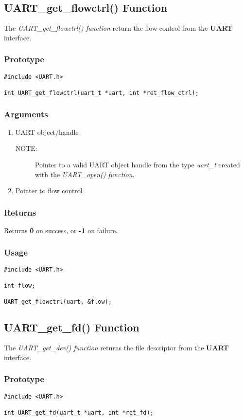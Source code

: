 \documentclass{report}
\begin{document}
\subsection{UART\_get\_flowctrl() Function}
The \textit{UART\_get\_flowctrl() function} return the flow
control from the \textbf{UART} interface.
\subsubsection*{Prototype}
\begin{lstlisting}
#include <UART.h>

int UART_get_flowctrl(uart_t *uart, int *ret_flow_ctrl);
\end{lstlisting}
\subsubsection*{Arguments}
\begin{enumerate}
\item UART object/handle
\begin{description}
\item[NOTE:] Pointer to a valid UART object handle from the type \textit{uart\_t}
created with the \textit{UART\_open() function}.
\end{description}
\item Pointer to flow control
\end{enumerate}
\subsubsection*{Returns}
Returns \textbf{0} on success, or \textbf{-1} on failure.
\subsubsection*{Usage}
\begin{lstlisting}
#include <UART.h>

int flow;

UART_get_flowctrl(uart, &flow);
\end{lstlisting}
\subsection{UART\_get\_fd() Function}
The \textit{UART\_get\_dev() function} returns the file
descriptor from the \textbf{UART} interface.
\subsubsection*{Prototype}
\begin{lstlisting}
#include <UART.h>

int UART_get_fd(uart_t *uart, int *ret_fd);
\end{lstlisting}
\end{document}
